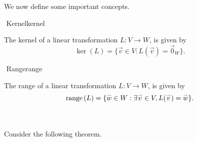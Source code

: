         We now define some important concepts.
        \begin{definition}{\Stop\,\,Kernel}{kernel}

            The kernel of a linear transformation \(L:V\to W\), is given by
            \begin{equation*}
                \ker(L)=\{\vec{v}\in V:L(\vec{v})=\vec{0}_W\}.
            \end{equation*}
            
        \end{definition}
        \begin{definition}{\Stop\,\,Range}{range}

            The range of a linear transformation \(L:V\to W\), is given by
            \begin{equation*}
                \text{range\,}(L)=\{\overset{_{\rightharpoonup}}{w}\in W:\exists\overset{_{\rightharpoonup}}{v}\in V, L(\overset{_{\rightharpoonup}}{v})=\overset{_{\rightharpoonup}}{w}\}.
            \end{equation*}
            
        \end{definition}
        \pagebreak
        \vphantom
        \\
        \\
        Consider the following theorem.
